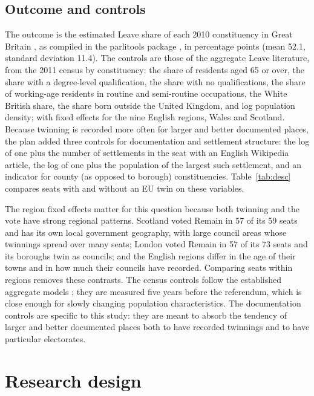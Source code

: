 \documentclass[11pt,a4paper]{article}
\begin{document}
\subsection{Outcome and controls}
The outcome is the estimated Leave share of each 2010 constituency in Great Britain \citep{hanretty2017}, as compiled in the parlitools package \citep{parlitools}, in percentage points (mean 52.1, standard deviation 11.4). The controls are those of the aggregate Leave literature, from the 2011 census by constituency: the share of residents aged 65 or over, the share with a degree-level qualification, the share with no qualifications, the share of working-age residents in routine and semi-routine occupations, the White British share, the share born outside the United Kingdom, and log population density; with fixed effects for the nine English regions, Wales and Scotland. Because twinning is recorded more often for larger and better documented places, the plan added three controls for documentation and settlement structure: the log of one plus the number of settlements in the seat with an English Wikipedia article, the log of one plus the population of the largest such settlement, and an indicator for county (as opposed to borough) constituencies. Table~\ref{tab:desc} compares seats with and without an EU twin on these variables.

The region fixed effects matter for this question because both twinning and the vote have strong regional patterns. Scotland voted Remain in 57 of its 59 seats and has its own local government geography, with large council areas whose twinnings spread over many seats; London voted Remain in 57 of its 73 seats and its boroughs twin as councils; and the English regions differ in the age of their towns and in how much their councils have recorded. Comparing seats within regions removes these contrasts. The census controls follow the established aggregate models \citep{becker2017,goodwin2016}; they are measured five years before the referendum, which is close enough for slowly changing population characteristics. The documentation controls are specific to this study: they are meant to absorb the tendency of larger and better documented places both to have recorded twinnings and to have particular electorates.

\section{Research design}\label{sec:design}
\end{document}
